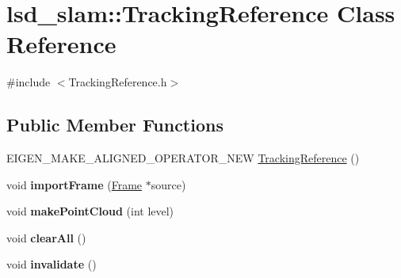 \hypertarget{classlsd__slam_1_1_tracking_reference}{\section{lsd\-\_\-slam\-:\-:Tracking\-Reference Class Reference}
\label{classlsd__slam_1_1_tracking_reference}
}


{\ttfamily \#include $<$Tracking\-Reference.\-h$>$}

\subsection*{Public Member Functions}
\begin{DoxyCompactItemize}
\item 
E\-I\-G\-E\-N\-\_\-\-M\-A\-K\-E\-\_\-\-A\-L\-I\-G\-N\-E\-D\-\_\-\-O\-P\-E\-R\-A\-T\-O\-R\-\_\-\-N\-E\-W \hyperlink{classlsd__slam_1_1_tracking_reference_a9b7ff59d246af0340beaad4f1d0aa480}{Tracking\-Reference} ()
\item 
\hypertarget{classlsd__slam_1_1_tracking_reference_a73119563af9f3bde976a5a9e4e988b2b}{void {\bfseries import\-Frame} (\hyperlink{classlsd__slam_1_1_frame}{Frame} $\ast$source)}\label{classlsd__slam_1_1_tracking_reference_a73119563af9f3bde976a5a9e4e988b2b}

\item 
\hypertarget{classlsd__slam_1_1_tracking_reference_a213f14e896c734faf7e2676282a7c54f}{void {\bfseries make\-Point\-Cloud} (int level)}\label{classlsd__slam_1_1_tracking_reference_a213f14e896c734faf7e2676282a7c54f}

\item 
\hypertarget{classlsd__slam_1_1_tracking_reference_a60a7eea36764253fe87d0b451c07dbb9}{void {\bfseries clear\-All} ()}\label{classlsd__slam_1_1_tracking_reference_a60a7eea36764253fe87d0b451c07dbb9}

\item 
\hypertarget{classlsd__slam_1_1_tracking_reference_a6e68faee69299c4bd7bc820a71db3719}{void {\bfseries invalidate} ()}\label{classlsd__slam_1_1_tracking_reference_a6e68faee69299c4bd7bc820a71db3719}

\end{DoxyCompactItemize}
